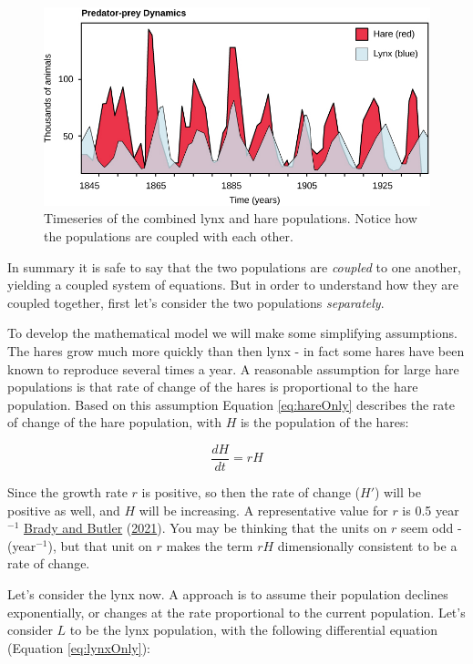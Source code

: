 \documentclass[
]{krantz}
\theoremstyle{definition}
\theoremstyle{definition}
\theoremstyle{definition}
\theoremstyle{definition}
\theoremstyle{remark}
\begin{document}
\begin{figure}

{\centering \includegraphics[width=0.7\linewidth]{figures/03-systems/Figure_45_06_01} 

}

\caption{Timeseries of the combined lynx and hare populations. Notice how the populations are coupled with each other.}\label{fig:lynx-hare-time}
\end{figure}

In summary it is safe to say that the two populations are \emph{coupled} to one another, yielding a coupled system of equations. But in order to understand how they are coupled together, first let's consider the two populations \emph{separately}.

To develop the mathematical model we will make some simplifying assumptions. The hares grow much more quickly than then lynx - in fact some hares have been known to reproduce several times a year. A reasonable assumption for large hare populations is that rate of change of the hares is proportional to the hare population. Based on this assumption Equation \eqref{eq:hareOnly} describes the rate of change of the hare population, with \(H\) is the population of the hares:

\begin{equation}
\frac{dH}{dt} = r H \label{eq:hareOnly}
\end{equation}

Since the growth rate \(r\) is positive, so then the rate of change (\(H'\)) will be positive as well, and \(H\) will be increasing. A representative value for \(r\) is 0.5 year\(^{-1}\) \protect\hyperlink{ref-brady_circle_2021}{Brady and Butler} (\protect\hyperlink{ref-brady_circle_2021}{2021}). You may be thinking that the units on \(r\) seem odd - (year\(^{-1}\)), but that unit on \(r\) makes the term \(rH\) dimensionally consistent to be a rate of change.

Let's consider the lynx now. A approach is to assume their population declines exponentially, or changes at the rate proportional to the current population. Let's consider \(L\) to be the lynx population, with the following differential equation (Equation \eqref{eq:lynxOnly}):
\end{document}
